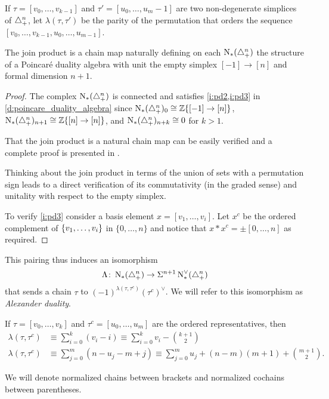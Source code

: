 \begin{notation}
	If $\tau = [v_0,\ldots,v_{k-1}]$ and $\tau'=[u_0,\ldots,u_{m}-1]$ are two non-degenerate simplices of $\triangle_{+}^n$, let $\lambda(\tau,\tau')$ be the parity of the permutation that orders the sequence $[v_0,\ldots,v_{k-1},u_0,\ldots,u_{m-1}]$.
\end{notation}

\begin{theorem}
	The join product is a chain map naturally defining on each $\operatorname{N}_{*}(\triangle_{+}^{n})$ the structure of a Poincar\'e duality algebra with unit the empty simplex $[-1] \to [n]$ and formal dimension $n+1$.
\end{theorem}


\begin{proof}
	The complex $\operatorname{N}_{*}(\triangle_{+}^{n})$ is connected and satisfies \cref{i:pd2,i:pd3} in \cref{d:poincare_duality_algebra} since $\operatorname{N}_{*}(\triangle_{+}^{n})_0 \cong \mathbb{Z}\{[-1] \to [n]\}$, $\operatorname{N}_{*}(\triangle_{+}^{n})_{n+1} \cong \mathbb{Z}\{[n] \to [n]\}$, and $\operatorname{N}_{*}(\triangle_{+}^{n})_{n+k} \cong 0$ for $k>1$.

	That the join product is a natural chain map can be easily verified and a complete proof is presented in \cite[p.19]{medina2020prop1}.

	Thinking about the join product in terms of the union of sets with a permutation sign leads to a direct verification of its commutativity (in the graded sense) and unitality with respect to the empty simplex.

	To verify \cref{i:pd3} consider a basis element $x = [v_1,\dots,v_i]$.
	Let $x^c$ be the ordered complement of $\{v_1,\dots,v_i\}$ in $\{0,\dots,n\}$ and notice that $x \ast x^c = \pm [0,\dots,n]$ as required.
\end{proof}
This pairing thus induces an isomorphism
\begin{equation}\label{eq:iso1}
	\Lambda\colon \operatorname{N}_{*}(\triangle_{+}^n)\to \Sigma^{n+1}\operatorname{N}^\vee_{*}(\triangle_{+}^n)
\end{equation}
 that sends a chain $\tau$ to $(-1)^{\lambda(\tau,\tau^c)}(\tau^c)^\vee$. We will refer to this isomorphism as \emph{Alexander duality}.

\begin{remark}\label{remark:alex}
 If $\tau = [v_0,\ldots,v_k]$ and $\tau^c  = [u_0,\ldots,u_m]$ are the ordered representatives, then
    \begin{align*}
        \lambda(\tau,\tau^c)&\equiv \sum_{i=0}^k (v_i-i) \equiv \sum_{i=0}^k v_i - \binom{k+1}{2} \\
        \lambda(\tau,\tau^c)&\equiv \sum_{j=0}^m (n-u_j-m+j) \equiv \sum_{j=0}^m u_j +(n-m)(m+1)+\binom{m+1}{2}.
    \end{align*}
\end{remark}

\begin{notation} We will denote normalized chains between brackets and normalized cochains between parentheses.
\end{notation}